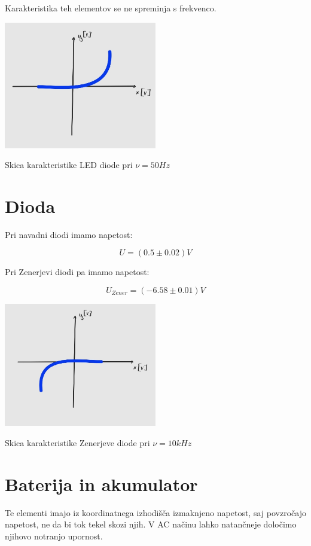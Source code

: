 \documentclass[12pt]{report}
\begin{document}
Karakteristika teh elementov se ne spreminja s frekvenco. 

\begin{slika}[H]
  \centering
  \includegraphics[width=0.5\textwidth]{LED}
  \caption{\small Skica karakteristike LED diode pri $\nu = 50\si{Hz}$}
\end{slika}

\section*{Dioda}

Pri navadni diodi imamo napetost:

\[
  U = (0.5 \pm 0.02)\si{V}  
\]

Pri Zenerjevi diodi pa imamo napetost:

\[
  U_{Zener} = (-6.58 \pm 0.01)\si{V}  
\]

\begin{slika}[H]
  \centering
  \includegraphics[width=0.5\textwidth]{dioda}
  \caption{\small Skica karakteristike Zenerjeve diode pri $\nu = 10\si{kHz}$}
\end{slika}

\section*{Baterija in akumulator}

Te elementi imajo iz koordinatnega izhodišča izmaknjeno napetost, saj povzročajo napetost, ne da bi tok tekel skozi njih. V AC načinu lahko natančneje določimo njihovo notranjo upornost.
\end{document}
